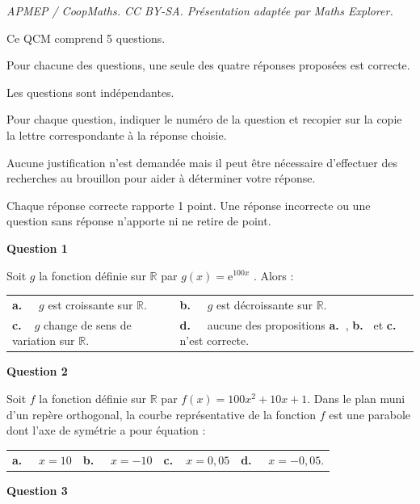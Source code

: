\documentclass[10pt]{article}
\providecommand{\R}{\mathbb{R}}
\providecommand{\e}{{\mathrm{e}}}
\begin{document}
\noindent\textit{APMEP / CoopMaths. CC BY-SA. Présentation adaptée par Maths Explorer.}\par\medskip
\medskip

Ce QCM comprend 5 questions.

 Pour chacune des questions, une seule des quatre réponses proposées est correcte. 

Les questions sont indépendantes.

Pour chaque question, indiquer le numéro de la question et recopier sur la copie la lettre
correspondante à la réponse choisie.

 Aucune justification n'est demandée mais il peut être
nécessaire d'effectuer des recherches au brouillon pour aider à déterminer votre réponse.

Chaque réponse correcte rapporte 1 point. Une réponse incorrecte ou une question sans
réponse n'apporte ni ne retire de point.

\medskip

\textbf{Question 1 }

\medskip 

Soit $g$ la fonction définie sur $\R$ par $g(x) = \e^{100x}$ . Alors :

\medskip 

\begin{tabularx}{\linewidth}{*{2}{X}}
\textbf{a.~~} $g$ est croissante sur $\R$. &\textbf{b.~~} $g $ est décroissante sur $\R$. \\\textbf{c.~~}$g$ change de sens de variation sur $\R$. & \textbf{d.~~} aucune des propositions \textbf{a.~}, \textbf{b.~} et \textbf{c.~} n'est correcte.
\end{tabularx}

\medskip

\textbf{Question 2}

\medskip 


Soit $f$ la fonction définie sur $\R$ par $f(x) = 100x^2 + 10x + 1$. Dans le plan muni d'un repère
orthogonal, la courbe représentative de la fonction $f$ est une parabole dont l'axe de
symétrie a pour équation :

\medskip 

\begin{tabularx}{\linewidth}{*{4}{X}}
\textbf{a.~~} $x = 10 $ &\textbf{b.~~} $x = -10 $&\textbf{c.~~}$x = 0,05 $& \textbf{d.~~} $ x = -0,05 $.
\end{tabularx}

\medskip

\textbf{Question 3}
\end{document}
